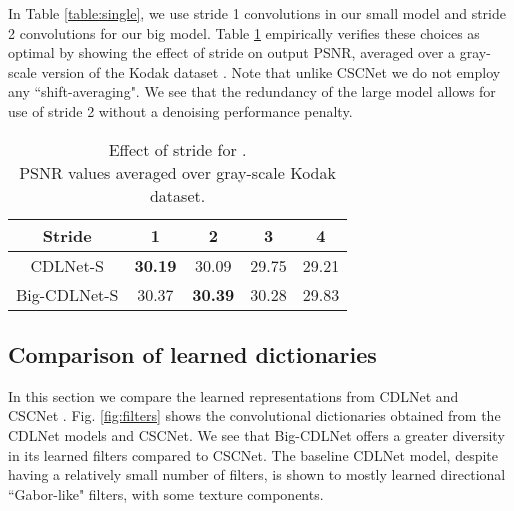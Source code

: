 \documentclass[conference]{IEEEtran}
\begin{document}
\begin{table}[ht]
\centering
\caption{Denoising performance (PSNR) on BSD68 testset (). All learned models trained on BSD432. ~numbers reported in \cite{Lecouat2020Games}.}
\label{table:single}
\end{table}

In Table \ref{table:single}, we use stride 1 convolutions in our small model and stride 2 convolutions for our big model. Table \ref{table:stride} empirically verifies these choices as optimal by showing the effect of stride on output PSNR, averaged over a gray-scale version of the Kodak dataset \cite{Kodak}. Note that unlike CSCNet we do not employ any ``shift-averaging". We see that the redundancy of the large model allows for use of stride 2 without a denoising performance penalty.


\begin{table}[ht]
\centering
\caption{Effect of stride for .\\ PSNR values averaged over gray-scale Kodak \cite{Kodak} dataset.}
\begin{tabular}{c|c|c|c|c}
\hline
Stride & 1 & 2 & 3 & 4 \\ \hline
CDLNet-S & {\bf 30.19} & 30.09 & 29.75 & 29.21 \\
Big-CDLNet-S & 30.37 & {\bf 30.39} & 30.28 & 29.83 \\ \hline
\end{tabular}\label{table:stride}
\end{table}

\subsection{Comparison of learned dictionaries}
In this section we compare the learned representations from CDLNet and CSCNet \cite{Simon2019}. Fig. \ref{fig:filters} shows the convolutional dictionaries obtained from the CDLNet models and CSCNet. We see that Big-CDLNet offers a greater diversity in its learned filters compared to CSCNet. The baseline CDLNet model, despite having a relatively small number of filters, is shown to mostly learned directional ``Gabor-like" filters, with some texture components.
\end{document}
